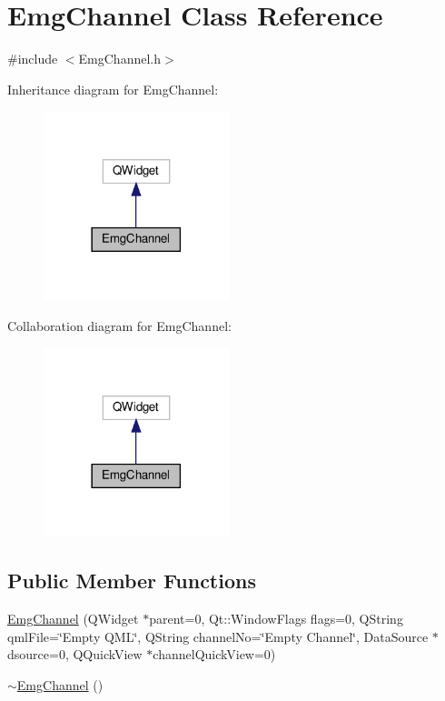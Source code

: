 \hypertarget{class_emg_channel}{}\section{Emg\+Channel Class Reference}
\label{class_emg_channel}


{\ttfamily \#include $<$Emg\+Channel.\+h$>$}



Inheritance diagram for Emg\+Channel\+:
\nopagebreak
\begin{figure}[H]
\begin{center}
\leavevmode
\includegraphics[width=153pt]{class_emg_channel__inherit__graph}
\end{center}
\end{figure}


Collaboration diagram for Emg\+Channel\+:
\nopagebreak
\begin{figure}[H]
\begin{center}
\leavevmode
\includegraphics[width=153pt]{class_emg_channel__coll__graph}
\end{center}
\end{figure}
\subsection*{Public Member Functions}
\begin{DoxyCompactItemize}
\item 
\hyperlink{class_emg_channel_a489334aa40273310d21023530fe06328}{Emg\+Channel} (Q\+Widget $\ast$parent=0, Qt\+::\+Window\+Flags flags=0, Q\+String qml\+File=\char`\"{}Empty Q\+ML\char`\"{}, Q\+String channel\+No=\char`\"{}Empty Channel\char`\"{}, Data\+Source $\ast$dsource=0, Q\+Quick\+View $\ast$channel\+Quick\+View=0)
\item 
\hyperlink{class_emg_channel_ad3f77c7f132f7974ceb56c5c9732de6f}{$\sim$\+Emg\+Channel} ()
\end{DoxyCompactItemize}


